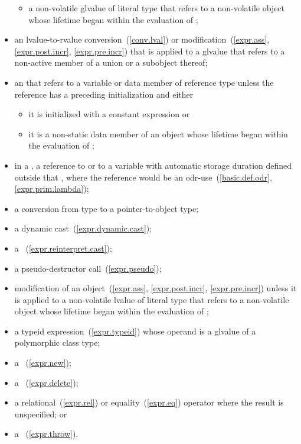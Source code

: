 \begin{itemize}
\begin{itemize}
  \item
  a non-volatile glvalue of literal type that refers to a non-volatile object
  whose lifetime began within the evaluation of ;
\end{itemize}

\item
an lvalue-to-rvalue conversion~(\ref{conv.lval}) or
modification~(\ref{expr.ass}, \ref{expr.post.incr}, \ref{expr.pre.incr})
that is applied to a glvalue
that refers to a non-active member of a union or a subobject thereof;

\item
an  that refers to a variable or
data member of reference type
unless the reference has a preceding initialization and either

\begin{itemize}
  \item
  it is initialized with a constant expression or

  \item
  it is a non-static data member of an object whose lifetime
  began within the evaluation of ;
\end{itemize}

\item
in a ,
a reference to  or to a variable with
automatic storage duration defined outside that
, where
the reference would be an odr-use~(\ref{basic.def.odr}, \ref{expr.prim.lambda});

\item
a conversion from type \cv{}  to a pointer-to-object type;

\item
a dynamic cast~(\ref{expr.dynamic.cast});

\item
a ~(\ref{expr.reinterpret.cast});

\item
a pseudo-destructor call~(\ref{expr.pseudo});

\item
modification of an object~(\ref{expr.ass}, \ref{expr.post.incr},
\ref{expr.pre.incr})
unless it is applied to a non-volatile lvalue of literal type
that refers to a non-volatile object
whose lifetime began within the evaluation of ;

\item
a typeid expression~(\ref{expr.typeid}) whose operand is a glvalue of a
polymorphic class type;

\item
a ~(\ref{expr.new});

\item
a ~(\ref{expr.delete});

\item
a relational~(\ref{expr.rel}) or equality~(\ref{expr.eq})
operator where the result is unspecified; or

\item
a ~(\ref{expr.throw}).
\end{itemize}

